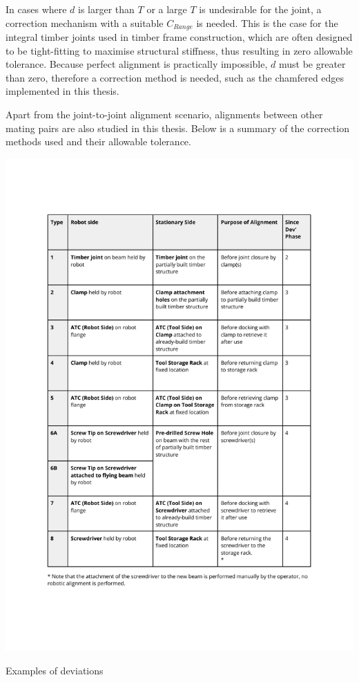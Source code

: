 In cases where $d$ is larger than $T$ or a large $T$ is undesirable for the joint, a correction mechanism with a suitable $C_{Range}$ is needed. This is the case for the integral timber joints used in timber frame construction, which are often designed to be tight-fitting to maximise structural stiffness, thus resulting in zero allowable tolerance. Because perfect alignment is practically impossible, $d$ must be greater than zero, therefore a correction method is needed, such as the chamfered edges implemented in this thesis.

Apart from the joint-to-joint alignment scenario, alignments between other mating pairs are also studied in this thesis. Below is a summary of the correction methods used and their allowable tolerance. 

\begin{table}
    \includegraphics[page=5, trim=25.4mm 132mm 23.4mm 33mm, clip, width=\textwidth]{tables/Tables in Chapter 9 to 11.pdf}
    \caption{Examples of deviations}
\end{table}


